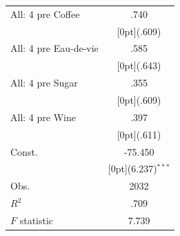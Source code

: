 \documentclass[12pt,a4paper,titlepage]{article}
\begin{document}
{\begin{tabular*}{\textwidth}{@{\extracolsep{\fill}}lc}
All: 4 pre Coffee &	.740 \\
&	\raisebox{.7ex}[0pt]{\scriptsize (.609)} \\
All: 4 pre Eau-de-vie &	.585 \\
&	\raisebox{.7ex}[0pt]{\scriptsize (.643)} \\
All: 4 pre Sugar &	.355 \\
&	\raisebox{.7ex}[0pt]{\scriptsize (.609)} \\
All: 4 pre Wine &	.397 \\
&	\raisebox{.7ex}[0pt]{\scriptsize (.611)} \\
Const. &	-75.450 \\
&	\raisebox{.7ex}[0pt]{\scriptsize (6.237)$^{***}$} \\
Obs. &	2032 \\
$ R^2$ &	.709 \\
$ F$ statistic &	7.739 \\
\hline\hline	
\end{tabular*}%

}
\end{document}
